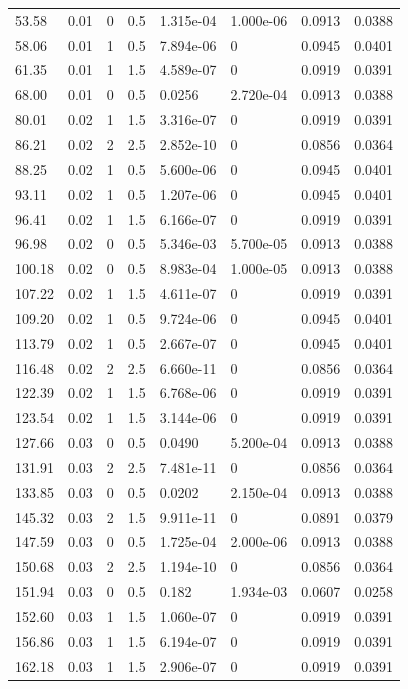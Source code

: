\documentclass[preview]{standalone}
\begin{document}
{{\begin{tabular}{L{1.2cm}C{1.2cm} C{0.3cm}C{0.5cm} C{1.4cm}C{1.4cm} C{1.4cm}C{1.4cm}}
  53.58  &  0.01  & 0     & 0.5 &  1.315e-04  & 1.000e-06  & 0.0913 &  0.0388   \\ 
  58.06  &  0.01  & 1     & 0.5 &  7.894e-06  & 0  & 0.0945 &  0.0401   \\ 
  61.35  &  0.01  & 1     & 1.5 &  4.589e-07  & 0  & 0.0919 &  0.0391   \\ 
  68.00  &  0.01  & 0     & 0.5 &  0.0256  & 2.720e-04  & 0.0913 &  0.0388   \\ 
  80.01  &  0.02  & 1     & 1.5 &  3.316e-07  & 0  & 0.0919 &  0.0391   \\ 
  86.21  &  0.02  & 2     & 2.5 &  2.852e-10  & 0  & 0.0856 &  0.0364   \\ 
  88.25  &  0.02  & 1     & 0.5 &  5.600e-06  & 0  & 0.0945 &  0.0401   \\ 
  93.11  &  0.02  & 1     & 0.5 &  1.207e-06  & 0  & 0.0945 &  0.0401   \\ 
  96.41  &  0.02  & 1     & 1.5 &  6.166e-07  & 0  & 0.0919 &  0.0391   \\ 
  96.98  &  0.02  & 0     & 0.5 &  5.346e-03  & 5.700e-05  & 0.0913 &  0.0388   \\ 
  100.18  &  0.02  & 0     & 0.5 &  8.983e-04  & 1.000e-05  & 0.0913 &  0.0388   \\ 
  107.22  &  0.02  & 1     & 1.5 &  4.611e-07  & 0  & 0.0919 &  0.0391   \\ 
  109.20  &  0.02  & 1     & 0.5 &  9.724e-06  & 0  & 0.0945 &  0.0401   \\ 
  113.79  &  0.02  & 1     & 0.5 &  2.667e-07  & 0  & 0.0945 &  0.0401   \\ 
  116.48  &  0.02  & 2     & 2.5 &  6.660e-11  & 0  & 0.0856 &  0.0364   \\ 
  122.39  &  0.02  & 1     & 1.5 &  6.768e-06  & 0  & 0.0919 &  0.0391   \\ 
  123.54  &  0.02  & 1     & 1.5 &  3.144e-06  & 0  & 0.0919 &  0.0391   \\ 
  127.66  &  0.03  & 0     & 0.5 &  0.0490  & 5.200e-04  & 0.0913 &  0.0388   \\ 
  131.91  &  0.03  & 2     & 2.5 &  7.481e-11  & 0  & 0.0856 &  0.0364   \\ 
  133.85  &  0.03  & 0     & 0.5 &  0.0202  & 2.150e-04  & 0.0913 &  0.0388   \\ 
  145.32  &  0.03  & 2     & 1.5 &  9.911e-11  & 0  & 0.0891 &  0.0379   \\ 
  147.59  &  0.03  & 0     & 0.5 &  1.725e-04  & 2.000e-06  & 0.0913 &  0.0388   \\ 
  150.68  &  0.03  & 2     & 2.5 &  1.194e-10  & 0  & 0.0856 &  0.0364   \\ 
  151.94  &  0.03  & 0     & 0.5 &  0.182  & 1.934e-03  & 0.0607 &  0.0258   \\ 
  152.60  &  0.03  & 1     & 1.5 &  1.060e-07  & 0  & 0.0919 &  0.0391   \\ 
  156.86  &  0.03  & 1     & 1.5 &  6.194e-07  & 0  & 0.0919 &  0.0391   \\ 
  162.18  &  0.03  & 1     & 1.5 &  2.906e-07  & 0  & 0.0919 &  0.0391   \\ 
\hline 
\end{tabular} 

}}
\end{document}
